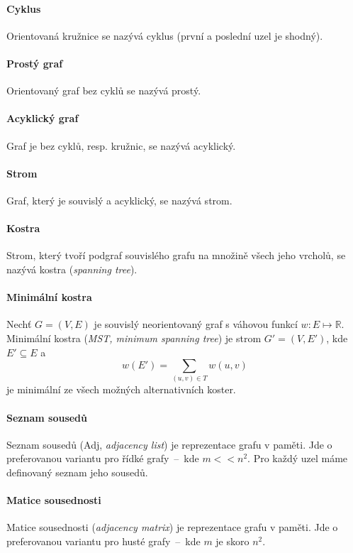 \paragraph*{Cyklus} Orientovaná kružnice se nazývá cyklus (první a poslední uzel je shodný).

\paragraph*{Prostý graf} Orientovaný graf bez cyklů se nazývá prostý.

\paragraph*{Acyklický graf} Graf je bez cyklů, resp. kružnic, se nazývá acyklický.

\paragraph*{Strom} Graf, který je souvislý a acyklický, se nazývá strom.

\paragraph*{Kostra} Strom, který tvoří podgraf souvislého grafu na množině všech jeho vrcholů, se nazývá kostra (\textit{spanning tree}).

\paragraph*{Minimální kostra} Nechť $G = (V, E)$ je souvislý neorientovaný graf s váhovou funkcí $w : E \mapsto \mathbb{R}$. Minimální kostra (\textit{MST, minimum spanning tree}) je strom $G' = (V, E')$, kde $E' \subseteq E$ a $$w(E') = \sum_{(u,v) \in T} w(u, v)$$ je minimální ze všech možných alternativních koster.

\paragraph*{Seznam sousedů} Seznam sousedů (Adj, \textit{adjacency list}) je reprezentace grafu v paměti. Jde o preferovanou variantu pro řídké grafy~--~kde $m << n^2$. Pro každý uzel máme definovaný seznam jeho sousedů.

\paragraph*{Matice sousednosti} Matice sousednosti (\textit{adjacency matrix}) je reprezentace grafu v paměti. Jde o preferovanou variantu pro husté grafy~--~kde $m$ je skoro $n^2$.

